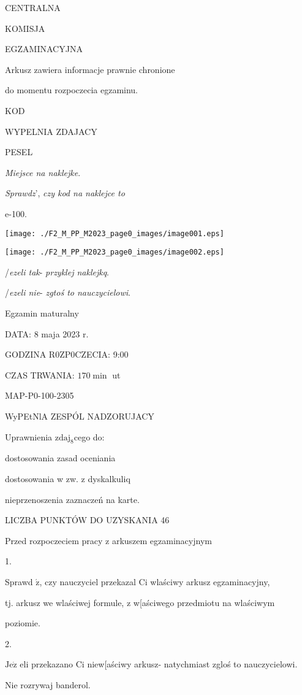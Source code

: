 \documentclass[a4paper,12pt]{article}
\begin{document}
CENTRALNA

KOMISJA

EGZAMINACYJNA

Arkusz zawiera informacje prawnie chronione

do momentu rozpoczecia egzaminu.

KOD

WYPELNIA ZDAJACY

PESEL

{\it Miejsce na naklejke}.

{\it Sprawdz}', {\it czy kod na naklejce to}

e-100.
\begin{center}
\texttt{[image: ./F2\_M\_PP\_M2023\_page0\_images/image001.eps]}

\texttt{[image: ./F2\_M\_PP\_M2023\_page0\_images/image002.eps]}
\end{center}
/{\it ezeli tak}- {\it przyklej naklejkq}.

/{\it ezeli nie}- {\it zgtoś to nauczycielowi}.

Egzamin maturalny

DATA: 8 maja 2023 r.

GODZINA R0ZP0CZECIA: 9:00

CZAS TRWANIA: $170 \displaystyle \min$ ut

MAP-P0-100-2305

WyPEtNlA ZESPÓL NADZORUJACY

Uprawnienia $\mathrm{z}\mathrm{d}\mathrm{a}\mathrm{j}_{8}$cego do:

\fbox{} dostosowania zasad oceniania

\fbox{} dostosowania w zw. z dyskalkuliq

\fbox{} nieprzenoszenia zaznaczeń na karte.

LICZBA PUNKTÓW DO UZYSKANIA 46

Przed rozpoczeciem pracy z arkuszem egzaminacyjnym

1.

Sprawd $\acute{\mathrm{z}}$, czy nauczyciel przekazal Ci wlaściwy arkusz egzaminacyjny,

tj. arkusz we wlaściwej formule, z w[aściwego przedmiotu na wlaściwym

poziomie.

2.

$\mathrm{J}\mathrm{e}\dot{\mathrm{z}}$ eli przekazano Ci niew[aściwy arkusz- natychmiast zgloś to nauczycielowi.

Nie rozrywaj banderol.
\end{document}
